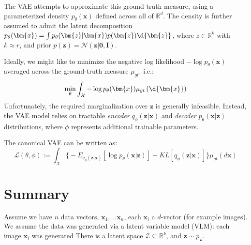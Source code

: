 \documentclass{article}
\begin{document}
The VAE attempts to approximate this ground truth measure, using a parameterized density $p_{\theta}(\bm{x})$ defined across all of $\mathbb{R}^{d}$.
The density is further assumed to admit the latent decomposition $p_{\theta}(\bm{x}) = \int p_{\theta}(\bm{z} | \bm{x}) p(\bm{z}) \d{\bm{z}}$, where $z \in \mathbb{R}^{k}$ with $k \approx r$, and prior $p(\bm{z}) = \mathcal{N}(\bm{z} | \bm{0}, \bm{I})$. 

Ideally, we might like to minimize the negative log likelihood $- \log p_{\theta}(\bm{x})$ averaged across the ground-truth measure $\mu_{gt}$. i.e.:
\[
  \min_{\theta} \int_{\mathcal{X}} - \log p_{\theta}(\bm{x}) \mu_{gt} \left( \d{\bm{x}} \right)
\]
Unfortunately, the required marginalization over $\bm{z}$ is generally infeasible. Instead, the VAE model relies on tractable \textit{encoder} $q_{\phi}(\bm{z} | \bm{x})$ and \textit{decoder} $p_{\theta}(\bm{x} | \bm{z})$ distributions, where $\phi$ represents additional trainable parameters. 

The canonical VAE can be written as:
\[
  \mathcal{L}(\theta, \phi) := \int_{\mathcal{X}} \Big\{ - E_{q_{\phi}(\bm{z} | \bm{x})} \left[ \log p_{\theta}(\bm{x} | \bm{z}) \right] + KL[q_{\phi}(\bm{z} | \bm{x})] \Big\} \mu_{gt}(d \bm{x}) 
\] 


\section{Summary}
Assume we have $n$ data vectors,  $\bm{x}_1, \ldots  \bm{x}_n$, each $\bm{x}_i$ a $d$-vector (for example images). We assume the data was generated via a latent variable model (VLM): each image $\bm{x}_i$ was generated  There is a latent space $\mathcal{Z} \subseteq \mathbb{R}^{k}$, and $\bm{z} \sim p_{\bm{z}}$. 
\end{document}
